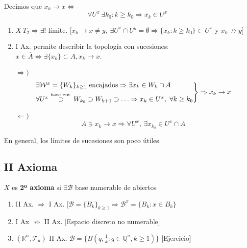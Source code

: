 \begin{defi}[Límites]
Decimos que $x_k \rightarrow x \Leftrightarrow$ 
\[
\forall U^x\ \exists k_0 : k \ge k_0 \Rightarrow x_k \in U^x
\]
\end{defi}
\begin{obs}
\begin{enumerate}
    \item $X\ T_2 \Rightarrow \exists! $ límite. [$x_k \rightarrow x \neq y,\ \exists U^x \cap U^y = \emptyset \Rightarrow \{x_k : k \ge k_0\} \subset U^x$ y $x_k \not \rightarrow y$]

    \item I Ax. permite describir la topología con sucesiones: $x \in \overline{A} \Leftrightarrow \exists \{x_k\} \subset A, x_k \rightarrow x$.

    \begin{demo}
    $\Rightarrow)$
    \[
    \begin{rcases}
        \exists \mathcal{W}^x = \{W_k\}_{k \ge 1} \text{ encajados} \Rightarrow \exists x_k \in W_k \cap A\\
        \forall U^x \stackrel{\text{base ent.}}{\supset} W_{k_0} \supset W_{k + 1} \supset \ldots \Rightarrow x_k \in U^x,\ \forall k \ge k_0  
    \end{rcases} \Rightarrow x_k \rightarrow x
    \]

    $\Leftarrow)$
    \[
    A \ni x_k \rightarrow x \Rightarrow \forall U^x,\ \exists x_{k_0} \in U^x \cap A
    \]
    \end{demo}
\end{enumerate}
En general, los límites de sucesiones son poco útiles.
\end{obs}

\subsection{II Axioma}%
\label{sub:iiax}
\begin{defi}[II Ax.]
$X$ es \textbf{2º axioma} si $\exists \mathcal{B}$ base numerable de abiertos
\end{defi}

\begin{obs}
\begin{enumerate}
    \item II Ax. $\Rightarrow$ I Ax. [$\mathcal{B} = \{B_k\}_{k \ge 1} \Rightarrow \mathcal{B}^x = \{B_k : x \in B_k\}$
    \item I Ax $\not \Rightarrow$ II Ax. [Espacio discreto no numerable]
    \item $\left( \mathbb{R}^n, \mathcal{T}_{u} \right)$ II Ax. $\mathcal{B} = \{B \left( q, \frac{1}{k} : q \in \mathbb{Q}^n, k \ge 1 \right)\}$ [Ejercicio]
\end{enumerate}
\end{obs}

